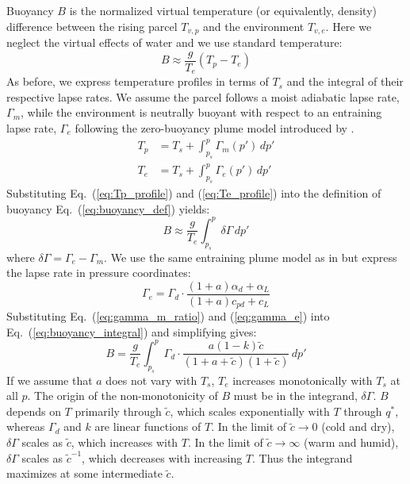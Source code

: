 \documentclass[draft]{ametsocV6.1}
\begin{document}
Buoyancy $B$ is the normalized virtual temperature (or equivalently, density) difference between the rising parcel $T_{v,p}$ and the environment $T_{v,e}$. Here we neglect the virtual effects of water and we use standard temperature:
\begin{equation}
B\approx\frac{g}{T_e}(T_p-T_e) \label{eq:buoyancy_def}
\end{equation}
As before, we express temperature profiles in terms of $T_s$ and the integral of their respective lapse rates. We assume the parcel follows a moist adiabatic lapse rate, $\Gamma_m$, while the environment is neutrally buoyant with respect to an entraining lapse rate, $\Gamma_e$ following the zero-buoyancy plume model introduced by \cite{singh2013}.
\begin{align}
T_p&=T_s+\int_{p_s}^p \Gamma_m(p') \, dp' \label{eq:Tp_profile} \\
T_e&=T_s+\int_{p_s}^p \Gamma_e(p') \, dp' \label{eq:Te_profile}
\end{align}
Substituting Eq.~(\ref{eq:Tp_profile}) and (\ref{eq:Te_profile}) into the definition of buoyancy Eq.~(\ref{eq:buoyancy_def}) yields:
\begin{equation}
B\approx\frac{g}{T_e}\int_{p_s}^p \delta \Gamma \, dp' \label{eq:buoyancy_integral}
\end{equation}
where $\delta\Gamma = \Gamma_e - \Gamma_m$. We use the same entraining plume model as in \cite{romps2016} but express the lapse rate in pressure coordinates:
\begin{equation}
\Gamma_e = \Gamma_d \cdot \frac{(1+a)\alpha_d + \alpha_L}{(1+a)c_{pd}+c_L} \label{eq:gamma_e}
\end{equation}
Substituting Eq.~(\ref{eq:gamma_m_ratio}) and (\ref{eq:gamma_e}) into Eq.~(\ref{eq:buoyancy_integral}) and simplifying gives:
\begin{equation}
    B = \frac{g}{T_e}\int_{p_s}^p \Gamma_d \cdot \frac{a(1-k)\tilde{c}}{(1+a+\tilde{c})(1+\tilde{c})} \, dp' \label{eq:buoyancy_final}
\end{equation}
If we assume that $a$ does not vary with $T_s$, $T_e$ increases monotonically with $T_s$ at all $p$. The origin of the non-monotonicity of $B$ must be in the integrand, $\delta \Gamma$. $B$ depends on $T$ primarily through $\tilde{c}$, which scales exponentially with $T$ through $q^*$, whereas $\Gamma_d$ and $k$ are linear functions of $T$. In the limit of $\tilde{c} \to 0$ (cold and dry), $\delta\Gamma$ scales as $\tilde{c}$, which increases with $T$. In the limit of $\tilde{c} \to \infty$ (warm and humid), $\delta\Gamma$ scales as $\tilde{c}^{-1}$, which decreases with increasing $T$. Thus the integrand maximizes at some intermediate $\tilde{c}$.
\end{document}
